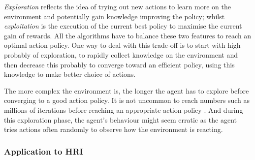 	\emph{Exploration} reflects the idea of trying out new actions to learn more on the environment and potentially gain knowledge improving the policy; whilst \emph{exploitation} is the execution of the current best policy to maximise the current gain of rewards. All the algorithms have to balance these two features to reach an optimal action policy. One way to deal with this trade-off is to start with high probably of exploration, to rapidly collect knowledge on the environment and then decrease this probably to converge toward an efficient policy, using this knowledge to make better choice of actions.
	
	The more complex the environment is, the longer the agent has to explore before converging to a good action policy. It is not uncommon to reach numbers such as millions of iterations before reaching an appropriate action policy \citep{sutton1998reinforcement}. And during this exploration phase, the agent's behaviour might seem erratic as the agent tries actions often randomly to observe how the environment is reacting.
	
	
	\subsubsection{Application to HRI}
	
